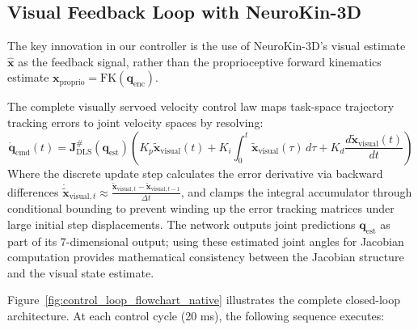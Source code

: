 \documentclass[12pt,a4paper,oneside]{report}
\begin{document}
\subsection{Visual Feedback Loop with NeuroKin-3D}

The key innovation in our controller is the use of NeuroKin-3D's visual estimate $\hat{\mathbf{x}}$ as the feedback signal, rather than the proprioceptive forward kinematics estimate $\mathbf{x}_{\text{proprio}} = \text{FK}(\mathbf{q}_{\text{enc}})$. 

The complete visually servoed velocity control law maps task-space trajectory tracking errors to joint velocity spaces by resolving:
\begin{equation}
\dot{\mathbf{q}}_{\text{cmd}}(t) = \mathbf{J}^{\#}_{\text{DLS}}(\mathbf{q}_{\text{est}}) \left( K_p \tilde{\mathbf{x}}_{\text{visual}}(t) + K_i \int_{0}^{t} \tilde{\mathbf{x}}_{\text{visual}}(\tau) \, d\tau + K_d \frac{d\tilde{\mathbf{x}}_{\text{visual}}(t)}{dt} \right)
\end{equation}
Where the discrete update step calculates the error derivative via backward differences $\dot{\tilde{\mathbf{x}}}_{\text{visual}, t} \approx \frac{\tilde{\mathbf{x}}_{\text{visual}, t} - \tilde{\mathbf{x}}_{\text{visual}, t-1}}{\Delta t}$, and clamps the integral accumulator through conditional bounding to prevent winding up the error tracking matrices under large initial step displacements. The network outputs joint predictions $\mathbf{q}_{\text{est}}$ as part of its 7-dimensional output; using these estimated joint angles for Jacobian computation provides mathematical consistency between the Jacobian structure and the visual state estimate.

Figure~\ref{fig:control_loop_flowchart_native} illustrates the complete closed-loop architecture. At each control cycle (20 ms), the following sequence executes:
\end{document}
